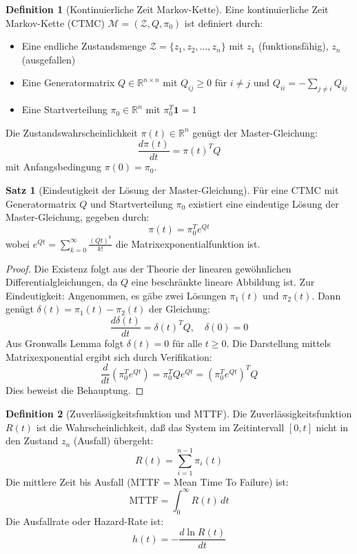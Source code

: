 \documentclass[a4paper,11pt]{article}
\theoremstyle{definition}
\newtheorem{definition}{Definition}
\newtheorem{satz}{Satz}
\newenvironment{beweis}{\begin{proof}}{\end{proof}}
\begin{document}
\begin{definition}[Kontinuierliche Zeit Markov-Kette]
    \label{def:markov_ctmc}
    Eine kontinuierliche Zeit Markov-Kette (CTMC) $\mathcal{M} = (\mathcal{Z}, Q, \pi_0)$ 
    ist definiert durch:
    \begin{itemize}
        \item Eine endliche Zustandsmenge $\mathcal{Z} = \{z_1, z_2, \ldots, z_n\}$ mit 
              $z_1$ (funktionsfähig), $z_n$ (ausgefallen)
        \item Eine Generatormatrix $Q \in \mathbb{R}^{n \times n}$ mit $Q_{ij} \geq 0$ für $i \neq j$ 
              und $Q_{ii} = -\sum_{j \neq i} Q_{ij}$
        \item Eine Startverteilung $\pi_0 \in \mathbb{R}^n$ mit $\pi_0^T \mathbf{1} = 1$
    \end{itemize}

    Die Zustandswahrscheinlichkeit $\pi(t) \in \mathbb{R}^n$ genügt der Master-Gleichung:
    \[
        \frac{d\pi(t)}{dt} = \pi(t)^T Q
    \]
    mit Anfangsbedingung $\pi(0) = \pi_0$.
\end{definition}

\begin{satz}[Eindeutigkeit der Lösung der Master-Gleichung]
    \label{satz:master_solution}
    Für eine CTMC mit Generatormatrix $Q$ und Startverteilung $\pi_0$ existiert eine eindeutige 
    Lösung der Master-Gleichung, gegeben durch:
    \[
        \pi(t) = \pi_0^T e^{Qt}
    \]
    wobei $e^{Qt} = \sum_{k=0}^{\infty} \frac{(Qt)^k}{k!}$ die Matrixexponentialfunktion ist.

    \begin{beweis}
        Die Existenz folgt aus der Theorie der linearen gewöhnlichen Differentialgleichungen, 
        da $Q$ eine beschränkte lineare Abbildung ist. Zur Eindeutigkeit: Angenommen, es gäbe 
        zwei Lösungen $\pi_1(t)$ und $\pi_2(t)$. Dann genügt $\delta(t) = \pi_1(t) - \pi_2(t)$ 
        der Gleichung:
        \[
            \frac{d\delta(t)}{dt} = \delta(t)^T Q, \quad \delta(0) = 0
        \]
        Aus Gronwalls Lemma folgt $\delta(t) = 0$ für alle $t \geq 0$. Die Darstellung mittels 
        Matrixexponential ergibt sich durch Verifikation: 
        \[
            \frac{d}{dt}(\pi_0^T e^{Qt}) = \pi_0^T Q e^{Qt} = (\pi_0^T e^{Qt})^T Q
        \]
        Dies beweist die Behauptung.
    \end{beweis}
\end{satz}

\begin{definition}[Zuverlässigkeitsfunktion und MTTF]
    Die Zuverlässigkeitsfunktion $R(t)$ ist die Wahrscheinlichkeit, daß das System im 
    Zeitintervall $[0, t]$ nicht in den Zustand $z_n$ (Ausfall) übergeht:
    \[
        R(t) = \sum_{i=1}^{n-1} \pi_i(t)
    \]
    Die mittlere Zeit bis Ausfall (MTTF = Mean Time To Failure) ist:
    \[
        \text{MTTF} = \int_0^{\infty} R(t) \, dt
    \]
    Die Ausfallrate oder Hazard-Rate ist:
    \[
        h(t) = -\frac{d \ln R(t)}{dt}
    \]
\end{definition}
\end{document}
